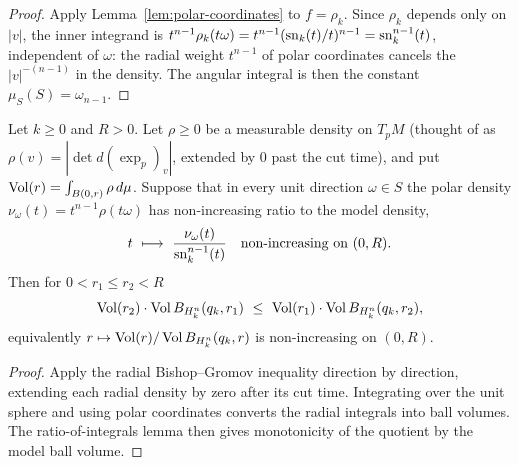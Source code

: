 \begin{proof}
\sketch
{}
Apply Lemma~\ref{lem:polar-coordinates} to $f=\rho_k$. Since $\rho_k$ depends only
on $|v|$, the inner integrand is $t^{n-1}\rho_k(t\omega)=t^{n-1}(\operatorname{sn}_k(t)/t)^{n-1}
=\operatorname{sn}_k^{n-1}(t)$, independent of $\omega$: the radial weight $t^{n-1}$ of polar
coordinates cancels the $|v|^{-(n-1)}$ in the density. The angular integral is then
the constant $\mu_S(S)=\omega_{n-1}$.
\end{proof}

\begin{lemma}
\label{lem:bishop-gromov-ball}





Let $k\ge0$ and $R>0$. Let $\rho\ge0$ be a measurable density on $T_pM$ (thought of
as $\rho(v)=|\det d(\exp_p)_v|$, extended by $0$ past the cut time), and put
$\operatorname{Vol}(r)=\int_{B(0,r)}\rho\,d\mu$. Suppose that in every unit direction
$\omega\in S$ the polar density $\nu_\omega(t)=t^{n-1}\rho(t\omega)$ has
non-increasing ratio to the model density,
$$t\ \longmapsto\ \frac{\nu_\omega(t)}{\sn_k^{n-1}(t)}
\quad\text{non-increasing on }(0,R).$$
Then for $0<r_1\le r_2<R$
$$\operatorname{Vol}(r_2)\cdot\operatorname{Vol} B_{H^n_k}(q_k,r_1)\ \le\
\operatorname{Vol}(r_1)\cdot\operatorname{Vol} B_{H^n_k}(q_k,r_2),$$
equivalently $r\mapsto\operatorname{Vol}(r)/\operatorname{Vol} B_{H^n_k}(q_k,r)$ is non-increasing on $(0,R)$.
\end{lemma}

\begin{proof}
\sketch
{}

Apply the radial Bishop--Gromov inequality direction by direction, extending each radial density by zero after its cut time. Integrating over the unit sphere and using polar coordinates converts the radial integrals into ball volumes. The ratio-of-integrals lemma then gives monotonicity of the quotient by the model ball volume.
\end{proof}


